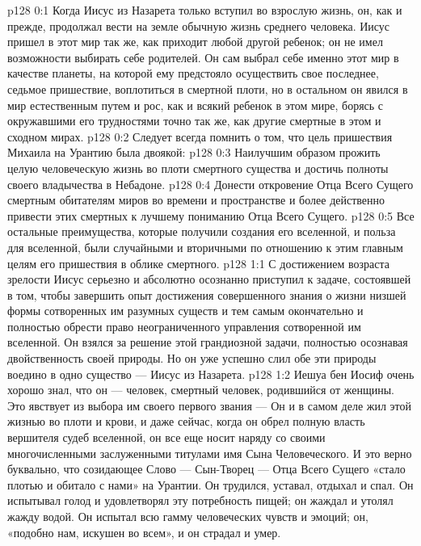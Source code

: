 \author{Комиссия срединников}
\vs p128 0:1 Когда Иисус из Назарета только вступил во взрослую жизнь, он, как и прежде, продолжал вести на земле обычную жизнь среднего человека. Иисус пришел в этот мир так же, как приходит любой другой ребенок; он не имел возможности выбирать себе родителей. Он сам выбрал себе именно этот мир в качестве планеты, на которой ему предстояло осуществить свое последнее, седьмое пришествие, воплотиться в смертной плоти, но в остальном он явился в мир естественным путем и рос, как и всякий ребенок в этом мире, борясь с окружавшими его трудностями точно так же, как другие смертные в этом и сходном мирах.
\vs p128 0:2 Следует всегда помнить о том, что цель пришествия Михаила на Урантию была двоякой:
\vs p128 0:3 \bibnobreakspace Наилучшим образом прожить целую человеческую жизнь во плоти смертного существа и достичь полноты своего владычества в Небадоне.
\vs p128 0:4 \bibnobreakspace Донести откровение Отца Всего Сущего смертным обитателям миров во времени и пространстве и более действенно привести этих смертных к лучшему пониманию Отца Всего Сущего.
\vs p128 0:5 \pc Все остальные преимущества, которые получили создания его вселенной, и польза для вселенной, были случайными и вторичными по отношению к этим главным целям его пришествия в облике смертного.
\vs p128 1:1 С достижением возраста зрелости Иисус серьезно и абсолютно осознанно приступил к задаче, состоявшей в том, чтобы завершить опыт достижения совершенного знания о жизни низшей формы сотворенных им разумных существ и тем самым окончательно и полностью обрести право неограниченного управления сотворенной им вселенной. Он взялся за решение этой грандиозной задачи, полностью осознавая двойственность своей природы. Но он уже успешно слил обе эти природы воедино в одно существо --- Иисус из Назарета.
\vs p128 1:2 Иешуа бен Иосиф очень хорошо знал, что он --- человек, смертный человек, родившийся от женщины. Это явствует из выбора им своего первого звания ---  Он и в самом деле жил этой жизнью во плоти и крови, и даже сейчас, когда он обрел полную власть вершителя судеб вселенной, он все еще носит наряду со своими многочисленными заслуженными титулами имя Сына Человеческого. И это верно буквально, что созидающее Слово --- Сын\hyp{}Творец --- Отца Всего Сущего «стало плотью и обитало с нами» на Урантии. Он трудился, уставал, отдыхал и спал. Он испытывал голод и удовлетворял эту потребность пищей; он жаждал и утолял жажду водой. Он испытал всю гамму человеческих чувств и эмоций; он, «подобно нам, искушен во всем», и он страдал и умер.
